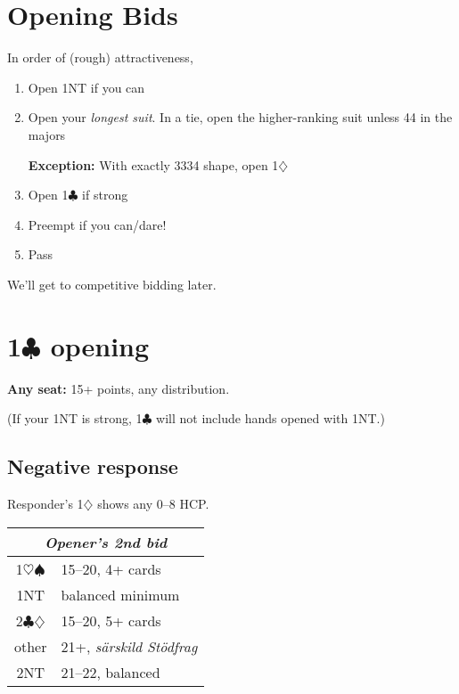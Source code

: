 \documentclass[a4paper, twoside, 11pt]{article}
\begin{document}
\vspace{1cm}
\begin{multicols}{3}



\upshape
\section{Opening Bids}
In order of (rough) attractiveness,
\begin{enumerate}
    \item Open 1NT if you can
    \item Open your \textit{longest suit}.
    In a tie, open the higher-ranking suit unless 44 in the majors

     \textbf{Exception:} With exactly 3334 shape, open 1$\diamondsuit$
    \item Open 1$\clubsuit$ if strong
    \item Preempt if you can/dare!
    \item Pass
\end{enumerate}

We'll get to competitive bidding later.



\section{1$\clubsuit$ opening}

\textbf{Any seat:} 15+ points, any distribution.

(If your 1NT is strong, 1$\clubsuit$ will not include hands opened with 1NT.)



\subsection*{Negative response}

Responder's 1$\diamondsuit$ shows any 0--8 HCP.

\begin{center}
\begin{tabular}{ |c|l| }
 \hline
 \multicolumn{2}{|c|}{\textit{Opener's 2nd bid}} \\
 \hline
 1$\heartsuit\spadesuit$ & 15--20, 4+ cards\\
 1NT& balanced minimum \\
 2$\clubsuit\diamondsuit$ & 15--20, 5+ cards\\
 other& 21+, \textit{särskild Stödfrag}\\
 2NT& 21--22, balanced\\


\end{tabular}
\end{center}
\end{multicols}
\end{document}
